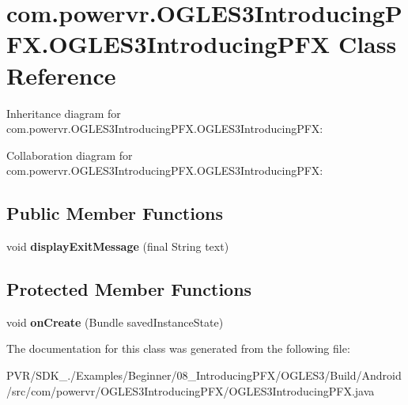 \hypertarget{classcom_1_1powervr_1_1_o_g_l_e_s3_introducing_p_f_x_1_1_o_g_l_e_s3_introducing_p_f_x}{\section{com.\+powervr.\+O\+G\+L\+E\+S3\+Introducing\+P\+F\+X.\+O\+G\+L\+E\+S3\+Introducing\+P\+F\+X Class Reference}
\label{classcom_1_1powervr_1_1_o_g_l_e_s3_introducing_p_f_x_1_1_o_g_l_e_s3_introducing_p_f_x}
}


Inheritance diagram for com.\+powervr.\+O\+G\+L\+E\+S3\+Introducing\+P\+F\+X.\+O\+G\+L\+E\+S3\+Introducing\+P\+F\+X\+:


Collaboration diagram for com.\+powervr.\+O\+G\+L\+E\+S3\+Introducing\+P\+F\+X.\+O\+G\+L\+E\+S3\+Introducing\+P\+F\+X\+:
\subsection*{Public Member Functions}
\begin{DoxyCompactItemize}
\item 
\hypertarget{classcom_1_1powervr_1_1_o_g_l_e_s3_introducing_p_f_x_1_1_o_g_l_e_s3_introducing_p_f_x_a21b13443260aa186b41c1455c7937c49}{void {\bfseries display\+Exit\+Message} (final String text)}\label{classcom_1_1powervr_1_1_o_g_l_e_s3_introducing_p_f_x_1_1_o_g_l_e_s3_introducing_p_f_x_a21b13443260aa186b41c1455c7937c49}

\end{DoxyCompactItemize}
\subsection*{Protected Member Functions}
\begin{DoxyCompactItemize}
\item 
\hypertarget{classcom_1_1powervr_1_1_o_g_l_e_s3_introducing_p_f_x_1_1_o_g_l_e_s3_introducing_p_f_x_a4eedf4bfcf6847b64022aff37f286709}{void {\bfseries on\+Create} (Bundle saved\+Instance\+State)}\label{classcom_1_1powervr_1_1_o_g_l_e_s3_introducing_p_f_x_1_1_o_g_l_e_s3_introducing_p_f_x_a4eedf4bfcf6847b64022aff37f286709}

\end{DoxyCompactItemize}


The documentation for this class was generated from the following file\+:\begin{DoxyCompactItemize}
\item 
P\+V\+R/\+S\+D\+K\+\_./\+Examples/\+Beginner/08\+\_\+\+Introducing\+P\+F\+X/\+O\+G\+L\+E\+S3/\+Build/\+Android/src/com/powervr/\+O\+G\+L\+E\+S3\+Introducing\+P\+F\+X/O\+G\+L\+E\+S3\+Introducing\+P\+F\+X.\+java\end{DoxyCompactItemize}
